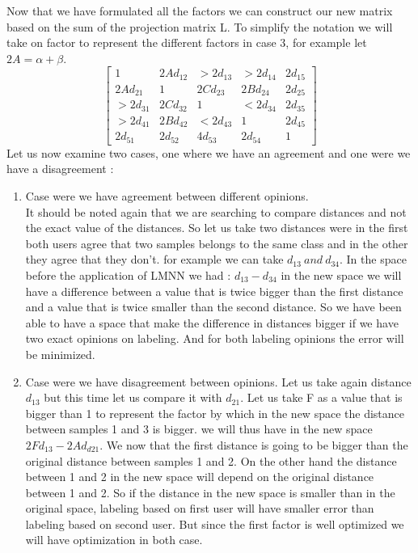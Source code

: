 \documentclass[hidelinks,12pt]{report}
\begin{document}
\begin{enumerate}
Now that we have formulated all the factors we can construct our new matrix based on the sum of the projection matrix L. To simplify the notation we will take on factor to represent the different factors in case 3, for example let $2A=\alpha+\beta$.
\[
\begin{bmatrix}
1            & 2Ad_{12} & >2d_{13}  & >2d_{14} & 2d_{15} \\
2Ad_{21}     & 1        & 2Cd_{23}  & 2Bd_{24} & 2d_{25} \\
>2d_{31}     & 2Cd_{32} & 1         & <2d_{34} & 2d_{35} \\
>2d_{41}     & 2Bd_{42} & <2d_{43}  & 1        & 2d_{45} \\
2d_{51}      & 2d_{52}  & 4d_{53}   & 2d_{54}  & 1
\end{bmatrix}
\]
Let us now examine two cases, one where we have an agreement and one were we have a disagreement :
\begin{enumerate}
\item Case were we have agreement between different opinions.\\
It should be noted again that we are searching to compare distances and not the exact value of the distances. So let us take two distances were in the first both users agree that two samples belongs to the same class and in the other they agree that they don't.  for example we can take $d_{13} \ and \ d_{34}$. In the space before the application of LMNN we had : $d_{13}-d_{34}$ in the new space we will have a difference between a value that is twice bigger than the first distance and a value that is twice smaller than the second distance. So we have been able to have a space that make the difference in distances bigger if we have two exact opinions on labeling. And for both labeling opinions the error will be minimized.
\item Case were we have disagreement between opinions.
Let us take again distance $d_13$ but this time let us compare it with $d_21$. Let us take F as a value that is bigger than 1 to represent the factor by which in the new space the distance between samples 1 and 3 is bigger. we will thus have in the new space $2Fd_{13}-2Ad_{d21}$. We now that the first distance is going to be bigger than the original distance between samples 1 and 2. On the other hand the distance between 1 and 2 in the new space will depend on the original distance between 1 and 2. So if the distance in the new space is smaller than in the original space, labeling based on first user will have smaller error than labeling based on second user. But since the first factor is well optimized we will have optimization in both case. \\

\end{enumerate}
\end{enumerate}
\end{document}
